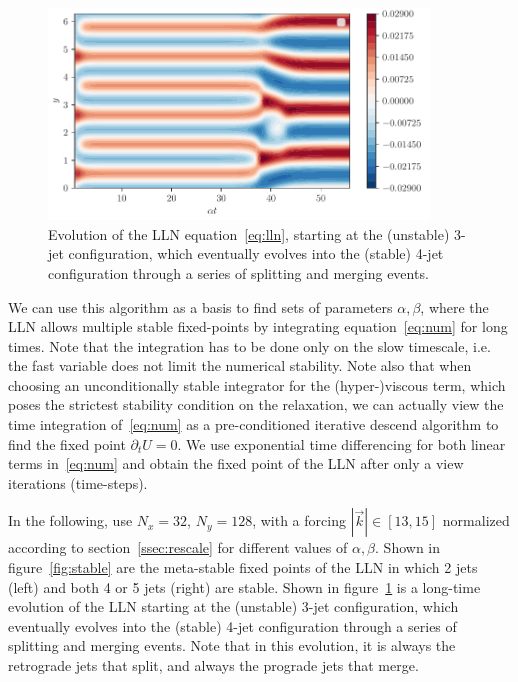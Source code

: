 \documentclass[12pt]{amsart}
\begin{document}
\begin{figure}[b]
  \begin{center}
    \includegraphics[width=0.9\textwidth]{figures/dynamics-4-jet}
  \end{center}
  \caption{Evolution of the LLN equation~\eqref{eq:lln}, starting at
    the (unstable) 3-jet configuration, which eventually evolves into
    the (stable) 4-jet configuration through a series of splitting and
    merging events.\label{fig:dynamics}}
\end{figure}

We can use this algorithm as a basis to find sets of parameters
$\alpha, \beta$, where the LLN allows multiple stable fixed-points by
integrating equation~\eqref{eq:num} for long times. Note that the
integration has to be done only on the slow timescale, i.e. the fast
variable does not limit the numerical stability. Note also that when
choosing an unconditionally stable integrator for the (hyper-)viscous
term, which poses the strictest stability condition on the relaxation,
we can actually view the time integration of~\eqref{eq:num} as a
pre-conditioned iterative descend algorithm to find the fixed point
$\partial_t U=0$. We use exponential time differencing for both linear
terms in~\eqref{eq:num} and obtain the fixed point of the LLN after
only a view iterations (time-steps).

In the following, use $N_x=32$, $N_y=128$, with a forcing $|\vec
k|\in[13,15]$ normalized according to section~\ref{ssec:rescale} for
different values of $\alpha, \beta$. Shown in figure~\ref{fig:stable}
are the meta-stable fixed points of the LLN in which 2 jets (left) and
both 4 or 5 jets (right) are stable. Shown in
figure~\ref{fig:dynamics} is a long-time evolution of the LLN starting
at the (unstable) 3-jet configuration, which eventually evolves into
the (stable) 4-jet configuration through a series of splitting and
merging events. Note that in this evolution, it is always the
retrograde jets that split, and always the prograde jets that merge.
\end{document}
